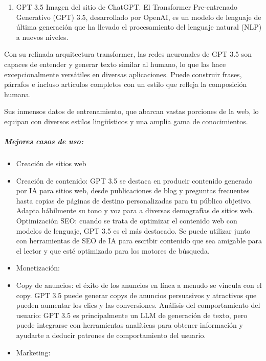 \documentclass[a4paper12pt]{article}
\providecommand{\tightlist}{%
      \setlength{\itemsep}{0pt}\setlength{\parskip}{0pt}}
\begin{document}
\begin{enumerate}
\def\labelenumi{\arabic{enumi}.}
\tightlist
\item
  GPT 3.5 Imagen del sitio de ChatGPT. El Transformer Pre-entrenado
  Generativo (GPT) 3.5, desarrollado por OpenAI, es un modelo de
  lenguaje de última generación que ha llevado el procesamiento del
  lenguaje natural (NLP) a nuevos niveles.
\end{enumerate}

Con su refinada arquitectura transformer, las redes neuronales de GPT
3.5 son capaces de entender y generar texto similar al humano, lo que
las hace excepcionalmente versátiles en diversas aplicaciones. Puede
construir frases, párrafos e incluso artículos completos con un estilo
que refleja la composición humana.

Sus inmensos datos de entrenamiento, que abarcan vastas porciones de la
web, lo equipan con diversos estilos lingüísticos y una amplia gama de
conocimientos.

\hypertarget{mejores-casos-de-uso}{%
\subparagraph{Mejores casos de uso:}\label{mejores-casos-de-uso}}

\begin{itemize}
\item
  Creación de sitios web
\item
  Creación de contenido: GPT 3.5 se destaca en producir contenido
  generado por IA para sitios web, desde publicaciones de blog y
  preguntas frecuentes hasta copias de páginas de destino personalizadas
  para tu público objetivo. Adapta hábilmente su tono y voz para a
  diversas demografías de sitios web. Optimización SEO: cuando se trata
  de optimizar el contenido web con modelos de lenguaje, GPT 3.5 es el
  más destacado. Se puede utilizar junto con herramientas de SEO de IA
  para escribir contenido que sea amigable para el lector y que esté
  optimizado para los motores de búsqueda.
\item
  Monetización:
\item
  Copy de anuncios: el éxito de los anuncios en línea a menudo se
  vincula con el copy. GPT 3.5 puede generar copys de anuncios
  persuasivos y atractivos que pueden aumentar los clics y las
  conversiones. Análisis del comportamiento del usuario: GPT 3.5 es
  principalmente un LLM de generación de texto, pero puede integrarse
  con herramientas analíticas para obtener información y ayudarte a
  deducir patrones de comportamiento del usuario.
\item
  Marketing:
\end{itemize}
\end{document}
